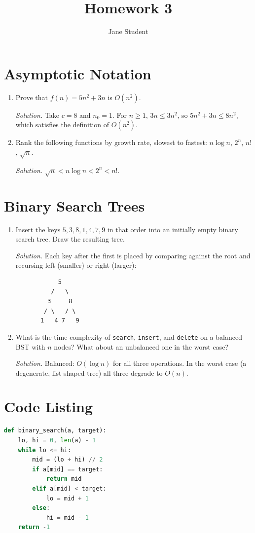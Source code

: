 \documentclass[onecolumn,oneside]{SUSTechHomework}
\author{Jane Student}
\title{Homework 3}
\begin{document}
\maketitle

\section{Asymptotic Notation}

\begin{enumerate}
    \item Prove that $f(n) = 5n^2 + 3n$ is $O(n^2)$.

    \textit{Solution.} Take $c = 8$ and $n_0 = 1$. For $n \geq 1$, $3n \leq
    3n^2$, so $5n^2 + 3n \leq 8n^2$, which satisfies the definition of $O(n^2)$.

    \item Rank the following functions by growth rate, slowest to fastest:
    $n \log n$, $2^n$, $n!$, $\sqrt{n}$.

    \textit{Solution.} $\sqrt{n} < n\log n < 2^n < n!$.
\end{enumerate}

\section{Binary Search Trees}

\begin{enumerate}
    \item Insert the keys $5, 3, 8, 1, 4, 7, 9$ in that order into an initially
    empty binary search tree. Draw the resulting tree.

    \textit{Solution.} Each key after the first is placed by comparing against
    the root and recursing left (smaller) or right (larger):
    \begin{verbatim}
            5
          /   \
         3     8
        / \   / \
       1   4 7   9
    \end{verbatim}

    \item What is the time complexity of \texttt{search}, \texttt{insert}, and
    \texttt{delete} on a balanced BST with $n$ nodes? What about an
    unbalanced one in the worst case?

    \textit{Solution.} Balanced: $O(\log n)$ for all three operations. In the
    worst case (a degenerate, list-shaped tree) all three degrade to $O(n)$.
\end{enumerate}

\section{Code Listing}

\begin{lstlisting}[language=Python, caption=Iterative binary search]
def binary_search(a, target):
    lo, hi = 0, len(a) - 1
    while lo <= hi:
        mid = (lo + hi) // 2
        if a[mid] == target:
            return mid
        elif a[mid] < target:
            lo = mid + 1
        else:
            hi = mid - 1
    return -1
\end{lstlisting}
\end{document}

